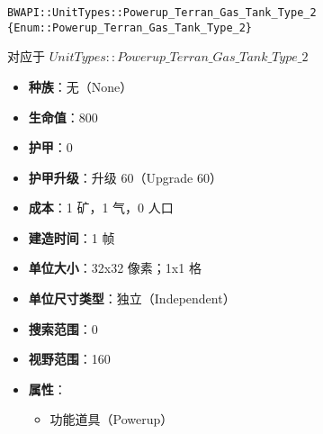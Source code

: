 \begin{tcolorbox}[colback=white, colframe=black!60!white, title=Powerup\_Terran\_Gas\_Tank\_Type\_2(), arc=0mm]
    \begin{verbatim}
BWAPI::UnitTypes::Powerup_Terran_Gas_Tank_Type_2 {Enum::Powerup_Terran_Gas_Tank_Type_2}
    \end{verbatim}
    对应于  $UnitTypes::Powerup\_Terran\_Gas\_Tank\_Type\_2$ 
    \begin{itemize}
        \item \textbf{种族}：无（None）
        \item \textbf{生命值}：800
        \item \textbf{护甲}：0
        \item \textbf{护甲升级}：升级 60（Upgrade 60）
        \item \textbf{成本}：1 矿，1 气，0 人口
        \item \textbf{建造时间}：1 帧
        \item \textbf{单位大小}：32x32 像素；1x1 格
        \item \textbf{单位尺寸类型}：独立（Independent）
        \item \textbf{搜索范围}：0
        \item \textbf{视野范围}：160
        \item \textbf{属性}：
            \begin{itemize}
                \item 功能道具（Powerup）
            \end{itemize}
    \end{itemize}
\end{tcolorbox}

